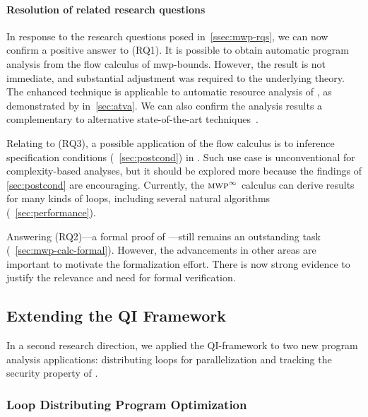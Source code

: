 \paragraph*{Resolution of related research questions}
In response to the research questions posed in~\autoref{ssec:mwp-rqs}, we can
now confirm a positive answer to (RQ1). It is possible to obtain automatic
program analysis from the flow calculus of mwp-bounds.
However, the result is not immediate, and substantial adjustment was required to
the underlying theory. The enhanced technique is applicable to automatic
resource analysis of , as demonstrated by 
in~\autoref{sec:atva}. We can also confirm the analysis results a complementary
to alternative state-of-the-art techniques~\cite[p. 5]{aubert2023b}.

Relating to (RQ3), a possible application of the flow calculus is to inference
specification conditions (\cf~\autoref{sec:postcond}) in
. Such use case is unconventional for complexity-based
analyses, but it should be explored more because the findings of
\autoref{sec:postcond} are encouraging. Currently, the
\(\textnormal{\textsc{mwp}}^\infty\) calculus can derive results for many kinds of
loops, including several natural algorithms (\cf~\autoref{sec:performance}).

Answering (RQ2)---a formal proof of ---still remains an
outstanding task (\cf~\autoref{sec:mwp-calc-formal}). However, the advancements
in other areas are important to motivate the formalization effort. There is now
strong evidence to justify the relevance and need for formal verification.

\subsection{Extending the QI Framework}
\label{subsec:res-qi}

In a second research direction, we applied the QI-framework to two new program
analysis applications: distributing loops for parallelization and tracking the security property of
.

\subsubsection{Loop Distributing Program Optimization}
\label{subsubsec:qi-opt}

